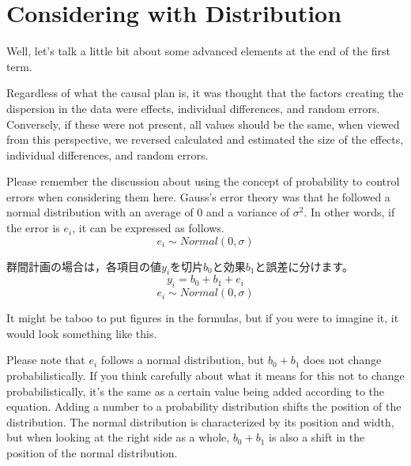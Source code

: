 \documentclass{ltjbook}
\begin{document}
\section{Considering with Distribution}
\label{thinkWithDistribution}
Well, let's talk a little bit about some advanced elements at the end of the first term.

Regardless of what the causal plan is, it was thought that the factors creating the dispersion in the data were effects, individual differences, and random errors. Conversely, if these were not present, all values should be the same, when viewed from this perspective, we reversed calculated and estimated the size of the effects, individual differences, and random errors.

Please remember the discussion about using the concept of probability to control errors when considering them here. Gauss's error theory was that he followed a normal distribution with an average of $0$ and a variance of $\sigma^2$. In other words, if the error is $e_{i}$, it can be expressed as follows.
\[ e_{i} \sim Normal(0, \sigma) \]


群間計画の場合は，各項目の値$y_i$を切片$b_0$と効果$b_1$と誤差に分けます。
\[ y_i = b_0 + b_1 + e_i \] \[e_i \sim Normal(0, \sigma) \]

It might be taboo to put figures in the formulas, but if you were to imagine it, it would look something like this.


Please note that $e_i$ follows a normal distribution, but $b_0+b_1$ does not change probabilistically. If you think carefully about what it means for this not to change probabilistically, it's the same as a certain value being added according to the equation. Adding a number to a probability distribution shifts the position of the distribution. The normal distribution is characterized by its position and width, but when looking at the right side as a whole, $b_0+b_1$ is also a shift in the position of the normal distribution.
\end{document}
